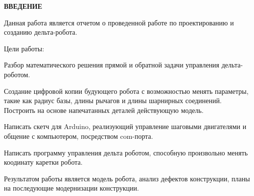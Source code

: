 \begin{center}
\large{\textbf{ВВЕДЕНИЕ}}\\
\end{center}


Данная работа является отчетом о проведенной работе по проектированию и созданию дельта-робота.

Цели работы:

Разбор математического решения прямой и обратной задачи управления дельта-роботом.

Создание цифровой копии будующего робота с возможностью менять параметры, такие как радиус базы, длины рычагов и длины шарнирных соединений. Построить на основе напечатанных деталей действующую модель.

Написать скетч для Arduino, реализующий управление шаговыми двигателями и общение с компьютером, посредством com-порта.

Написать программу управления дельта роботом, способную произвольно менять коодинату каретки робота.


Результатом работы является модель робота, анализ дефектов конструкции, планы на последующие модернизации конструкции. 
